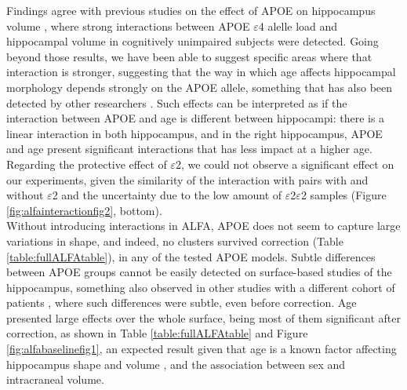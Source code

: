 Findings agree with previous studies on the effect of APOE on hippocampus volume \cite{Pievani2011,Mueller2009,Cacciaglia2018}, where strong interactions between APOE $\varepsilon$4 alelle load and hippocampal volume in cognitively unimpaired subjects were detected. Going beyond those results, we have been able to suggest specific areas where that interaction is stronger, suggesting that the way in which age affects hippocampal morphology depends strongly on the APOE allele, something that has also been detected by other researchers \cite{Shi2014}. Such effects can be interpreted as if the interaction between APOE and age is different between hippocampi: there is a linear interaction in both hippocampus, and in the right hippocampus, APOE and age present significant interactions that has less impact at a higher age. Regarding the protective effect of $\varepsilon$2, we could not observe a significant effect on our experiments, given the similarity of the interaction with pairs with and without $\varepsilon$2 and the uncertainty due to the low amount of $\varepsilon$2$\varepsilon$2 samples (Figure \ref{fig:alfainteractionfig2}, bottom). \\

Without introducing interactions in ALFA, APOE does not seem to capture large variations in shape, and indeed, no clusters survived correction (Table \ref{table:fullALFAtable}), in any of the tested APOE models. Subtle differences between APOE groups cannot be easily detected on surface-based studies of the hippocampus, something also observed in other studies with a different cohort of patients \cite{Dong2019}, where such differences were subtle, even before correction. Age presented large effects over the whole surface, being most of them significant after correction, as shown in Table \ref{table:fullALFAtable} and Figure \ref{fig:alfabaselinefig1}, an expected result given that age is a known factor affecting hippocampus shape and volume \cite{Lind2006}, and the association between sex and intracraneal volume. \\ 

